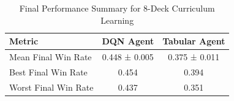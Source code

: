 \begin{table}[h!]
\centering
\caption{Final Performance Summary for 8-Deck Curriculum Learning}
\label{tab:final_performance_8deck}
\begin{tabular}{lcc}
\hline
Metric & DQN Agent & Tabular Agent \\
\hline
Mean Final Win Rate & 0.448 ± 0.005 & 0.375 ± 0.011 \\
Best Final Win Rate & 0.454 & 0.394 \\
Worst Final Win Rate & 0.437 & 0.351 \\
\hline
\end{tabular}
\end{table}
